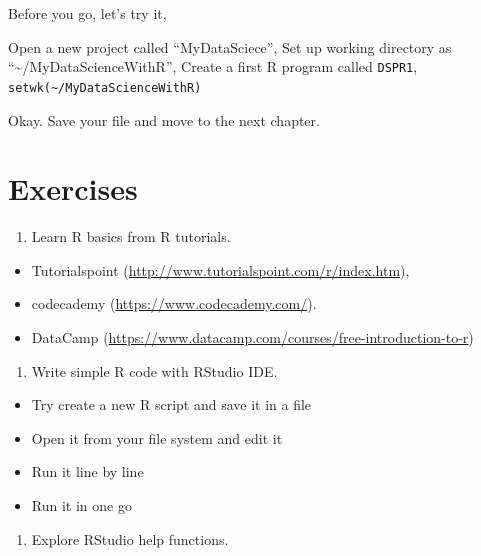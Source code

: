 \documentclass[
]{book}
\makeatletter
\providecommand{\tightlist}{%
  \setlength{\itemsep}{0pt}\setlength{\parskip}{0pt}}
\newenvironment{kframe}{%
\medskip{}
\setlength{\fboxsep}{.8em}
 \def\at@end@of@kframe{}%
 \ifinner\ifhmode%
  \def\at@end@of@kframe{\end{minipage}}%
  \begin{minipage}{\columnwidth}%
 \fi\fi%
 \def\FrameCommand##1{\hskip\@totalleftmargin \hskip-\fboxsep
 \colorbox{shadecolor}{##1}\hskip-\fboxsep
     \hskip-\linewidth \hskip-\@totalleftmargin \hskip\columnwidth}%
 \MakeFramed {\advance\hsize-\width
   \@totalleftmargin\z@ \linewidth\hsize
   \@setminipage}}%
 {\par\unskip\endMakeFramed%
 \at@end@of@kframe}
\newenvironment{rmdblock}[1]
  {
  \begin{itemize}
  \renewcommand{\labelitemi}{
    \raisebox{-.7\height}[0pt][0pt]{
      {\setkeys{Gin}{width=3em,keepaspectratio}\texttt{[image: images/\#1]}}
    }
  }
  \setlength{\fboxsep}{1em}
  \begin{kframe}
  \item
  }
  {
  \end{kframe}
  \end{itemize}
  }
\newenvironment{rmdaction}
  {\begin{rmdblock}{action}}
  {\end{rmdblock}}
\makeatother
\begin{document}
Before you go, let's try it,

\begin{rmdaction}
Open a new project called ``MyDataSciece'',
Set up working directory as ``\textasciitilde/MyDataScienceWithR'',
Create a first R program called \texttt{DSPR1},
\texttt{setwk(\textasciitilde{}/MyDataScienceWithR)}
\end{rmdaction}

Okay. Save your file and move to the next chapter.

\hypertarget{exercises-1}{%
\section*{Exercises}\label{exercises-1}}


\begin{enumerate}
\def\labelenumi{\arabic{enumi}.}
\tightlist
\item
  Learn R basics from R tutorials.
\end{enumerate}

\begin{itemize}
\tightlist
\item
  Tutorialspoint (\url{http://www.tutorialspoint.com/r/index.htm}),
\item
  codecademy (\url{https://www.codecademy.com/}).
\item
  DataCamp (\url{https://www.datacamp.com/courses/free-introduction-to-r})
\end{itemize}

\begin{enumerate}
\def\labelenumi{\arabic{enumi}.}
\setcounter{enumi}{1}
\tightlist
\item
  Write simple R code with RStudio IDE.
\end{enumerate}

\begin{itemize}
\tightlist
\item
  Try create a new R script and save it in a file
\item
  Open it from your file system and edit it
\item
  Run it line by line
\item
  Run it in one go
\end{itemize}

\begin{enumerate}
\def\labelenumi{\arabic{enumi}.}
\setcounter{enumi}{2}
\tightlist
\item
  Explore RStudio help functions.
\end{enumerate}
\end{document}
